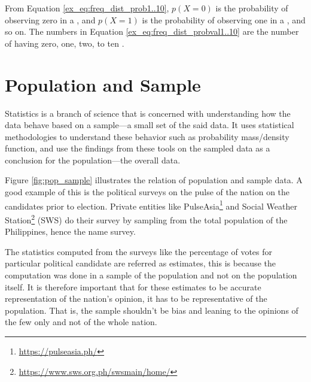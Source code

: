 \begin{exmp}
From Equation \ref{ex_eq:freq_dist_prob1..10}, $ p(X=0)$ is the probability of observing zero   in a  , and $ p(X=1)$ is the probability of observing one   in a  , and so on. The numbers in Equation \ref{ex_eq:freq_dist_probval1..10} are the number of   having zero, one, two, to ten  .

\end{exmp}
\section{Population and Sample}
Statistics is a branch of science that is concerned with understanding how the data behave based on a sample---a small set of the said data. It uses statistical methodologies to understand these behavior such as probability mass/density function, and use the findings from these tools on the sampled data as a conclusion for the population---the overall data.

Figure \ref{fig:pop_sample} illustrates the relation of population and sample data. A good example of this is the political surveys on the pulse of the nation on the candidates prior to election. Private entities like PulseAsia\footnote{\url{https://pulseasia.ph/}} and Social Weather Station\footnote{\url{https://www.sws.org.ph/swsmain/home/}} (SWS) do their survey by  sampling from the total population of the Philippines, hence the name survey.

The statistics computed from the surveys like the percentage of votes for particular political candidate are referred as estimates, this is because the computation was done in a sample of the population and not on the population itself. It is therefore important that for these estimates to be accurate representation of the nation's opinion, it has to be representative of the population. That is, the sample shouldn't be bias and leaning to the opinions of the few only and not of the whole nation.

